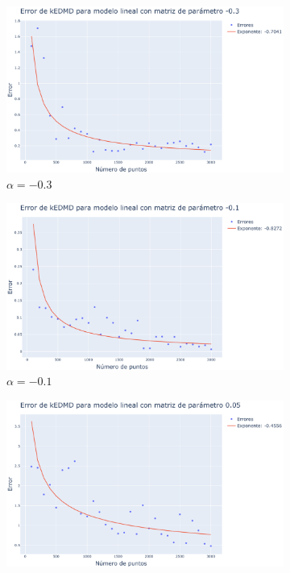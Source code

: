 \begin{figure}[h]
    \centering
    \begin{subfigure}[b]{0.32\textwidth}
        \centering
        \includegraphics[width=\textwidth]{img/content/chapter3/Linear1Errors.pdf}
        \caption{$\alpha=-0.3$}
        \label{fig:image1}
    \end{subfigure}
    \hfill
    \begin{subfigure}[b]{0.32\textwidth}
        \centering
        \includegraphics[width=\textwidth]{img/content/chapter3/Linear2Errors.pdf}
        \caption{$\alpha=-0.1$}
        \label{fig:image2}
    \end{subfigure}
    \hfill
    \begin{subfigure}[b]{0.32\textwidth}
        \centering
        \includegraphics[width=\textwidth]{img/content/chapter3/Linear3Errors.pdf}

\end{subfigure}
\end{figure}
